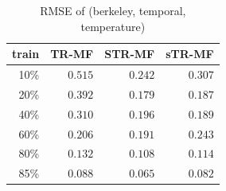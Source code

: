 \begin{table} [htbp]
\setlength{\tabcolsep}{2pt}
\centering
\caption{RMSE of (berkeley, temporal, temperature)}
\label{table:spatial_temporal_tem}
\begin{tabular} {r | r r r}
	train	& TR-MF	&	STR-MF	&	sTR-MF	\\ \hline
	10\% & $ 0.515 $ & $ \mathbf{ 0.242 } $ & $ 0.307 $ \\
	20\% & $ 0.392 $ & $ \mathbf{ 0.179 } $ & $ 0.187 $ \\
	40\% & $ 0.310 $ & $ 0.196 $ & $ \mathbf{ 0.189 } $ \\
	60\% & $ 0.206 $ & $ \mathbf{ 0.191 } $ & $ 0.243 $ \\
	80\% & $ 0.132 $ & $ \mathbf{ 0.108 } $ & $ 0.114 $ \\
	85\% & $ 0.088 $ & $ \mathbf{ 0.065 } $ & $ 0.082 $ \\
\end{tabular}
\end{table}

